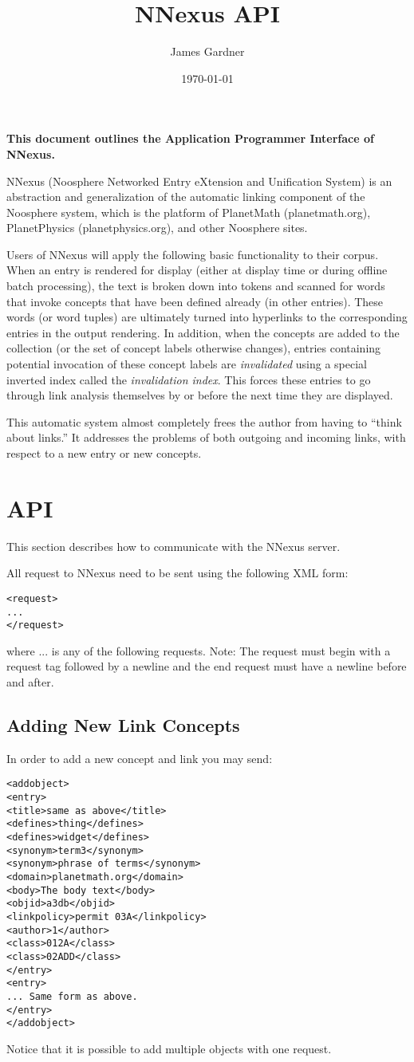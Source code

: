 \documentclass{article}
\author{James Gardner}
\date{\today}
\title{NNexus API}
\begin{document}
\maketitle

{\bf This document outlines the Application Programmer Interface of NNexus.}


NNexus (Noosphere Networked Entry eXtension and Unification System) is an abstraction and generalization of the automatic linking component of the Noosphere system, which is the platform of PlanetMath (planetmath.org), PlanetPhysics (planetphysics.org), and other Noosphere sites.

Users of NNexus will apply the following basic functionality to their corpus.  When an entry is rendered for display (either at display time or during offline batch processing), the text is broken down into tokens and scanned for words that invoke concepts that have been defined already (in other entries).  These words (or word tuples) are ultimately turned into hyperlinks to the corresponding entries in the output rendering.  
In addition, when the concepts are added to the collection (or the set of concept labels otherwise changes), entries containing potential invocation of these concept labels are \emph{invalidated} using a special inverted index called the \emph{invalidation index}.  This forces these entries to go through link analysis themselves by or before the next time they are displayed.

This automatic system almost completely frees the author from having to ``think about links.''  It addresses the problems of both outgoing and incoming links, with respect to a new entry or new concepts.

\section{API}
This section describes how to communicate with the NNexus server.

All request to NNexus need to be sent using the following XML form:
\begin{verbatim}
<request>
...
</request>
\end{verbatim}

where ... is any of the following requests. Note: The request must begin with a request tag followed by
a newline and the end request must have a newline before and after.

\subsection{Adding New Link Concepts}
In order to add a new concept and link you may send:
\begin{verbatim}
<addobject>
<entry>
<title>same as above</title>
<defines>thing</defines>
<defines>widget</defines>
<synonym>term3</synonym> 
<synonym>phrase of terms</synonym>
<domain>planetmath.org</domain>
<body>The body text</body>
<objid>a3db</objid>
<linkpolicy>permit 03A</linkpolicy>
<author>1</author>
<class>012A</class>
<class>02ADD</class>
</entry>
<entry>
... Same form as above.
</entry>
</addobject>
\end{verbatim}
Notice that it is possible to add multiple objects with one request.
\end{document}
